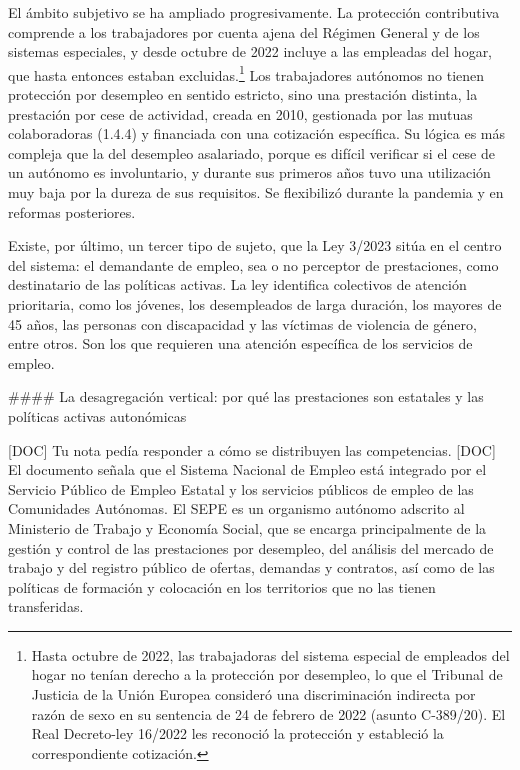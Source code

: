 \documentclass[10pt,a4paper]{article}
\begin{document}
El ámbito subjetivo se ha ampliado progresivamente. La protección contributiva comprende a los trabajadores por cuenta ajena del Régimen General y de los sistemas especiales, y desde octubre de 2022 incluye a las empleadas del hogar, que hasta entonces estaban excluidas.\footnote{Hasta octubre de 2022, las trabajadoras del sistema especial de empleados del hogar no tenían derecho a la protección por desempleo, lo que el Tribunal de Justicia de la Unión Europea consideró una discriminación indirecta por razón de sexo en su sentencia de 24 de febrero de 2022 (asunto C-389/20). El Real Decreto-ley 16/2022 les reconoció la protección y estableció la correspondiente cotización.
} Los trabajadores autónomos no tienen protección por desempleo en sentido estricto, sino una prestación distinta, la prestación por cese de actividad, creada en 2010, gestionada por las mutuas colaboradoras (1.4.4) y financiada con una cotización específica. Su lógica es más compleja que la del desempleo asalariado, porque es difícil verificar si el cese de un autónomo es involuntario, y durante sus primeros años tuvo una utilización muy baja por la dureza de sus requisitos. Se flexibilizó durante la pandemia y en reformas posteriores.

Existe, por último, un tercer tipo de sujeto, que la Ley 3/2023 sitúa en el centro del sistema: el demandante de empleo, sea o no perceptor de prestaciones, como destinatario de las políticas activas. La ley identifica colectivos de atención prioritaria, como los jóvenes, los desempleados de larga duración, los mayores de 45 años, las personas con discapacidad y las víctimas de violencia de género, entre otros. Son los que requieren una atención específica de los servicios de empleo.

#### La desagregación vertical: por qué las prestaciones son estatales y las políticas activas autonómicas

[DOC] Tu nota pedía responder a cómo se distribuyen las competencias. [DOC] El documento señala que el Sistema Nacional de Empleo está integrado por el Servicio Público de Empleo Estatal y los servicios públicos de empleo de las Comunidades Autónomas. El SEPE es un organismo autónomo adscrito al Ministerio de Trabajo y Economía Social, que se encarga principalmente de la gestión y control de las prestaciones por desempleo, del análisis del mercado de trabajo y del registro público de ofertas, demandas y contratos, así como de las políticas de formación y colocación en los territorios que no las tienen transferidas.
\end{document}
